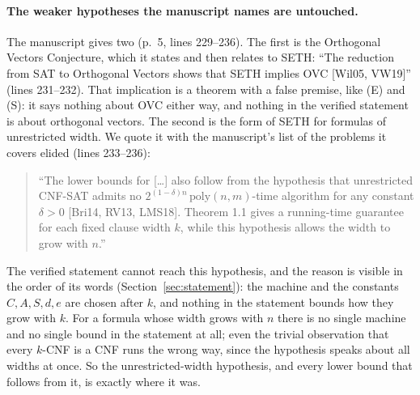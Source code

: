 \paragraph{The weaker hypotheses the manuscript names are untouched.}
The manuscript gives two (p.~5, lines 229--236). The first is the
Orthogonal Vectors Conjecture, which it states and then relates to SETH:
``The reduction from SAT to Orthogonal Vectors shows that SETH implies
OVC [Wil05, VW19]'' (lines 231--232). That implication is a theorem
with a false premise, like (E) and (S): it says nothing about OVC either
way, and nothing in the verified statement is about orthogonal vectors.
The second is the form of SETH for formulas of unrestricted width. We
quote it with the manuscript's list of the problems it covers elided
(lines 233--236):
\begin{quote}\small
``The lower bounds for [\ldots] also follow from the hypothesis that
unrestricted CNF-SAT admits no $2^{(1-\delta)n}\,\mathrm{poly}(n,m)$-time
algorithm for any constant $\delta > 0$ [Bri14, RV13, LMS18]. Theorem
1.1 gives a running-time guarantee for each fixed clause width $k$,
while this hypothesis allows the width to grow with $n$.''
\end{quote}
The verified statement cannot reach this hypothesis, and the reason is
visible in the order of its words (Section~\ref{sec:statement}): the
machine and the constants $C, A, S, d, e$ are chosen after $k$, and
nothing in the statement bounds how they grow with $k$. For a formula
whose width grows with $n$ there is no single machine and no single
bound in the statement at all; even the trivial observation that every
$k$-CNF is a CNF runs the wrong way, since the hypothesis speaks about
all widths at once. So the unrestricted-width hypothesis, and every
lower bound that follows from it, is exactly where it was.

